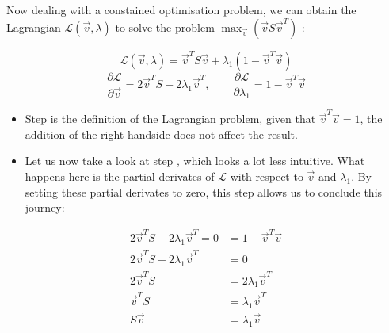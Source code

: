 Now dealing with a constained optimisation problem, we can obtain the Lagrangian $\mathcal{L}(\overrightarrow{v}, \lambda)$ to solve the problem $\max_{\overrightarrow{v}} (\overrightarrow{v} S \overrightarrow{v}^T)$ \cite{deisenroth2020mathematics}:

\begin{equation}
	\label{formula:maxOptimisationI}
	\mathcal{L}(\overrightarrow{v}, \lambda) = \overrightarrow{v}^T S \overrightarrow{v} + \lambda_1 (1 - \overrightarrow{v}^T\overrightarrow{v})
\end{equation}
\begin{equation}
	\label{formula:maxOptimisationII}
	\frac{\partial \mathcal{L}}{\partial \overrightarrow{v}} = 2 \overrightarrow{v}^T S - 2 \lambda_1 \overrightarrow{v}^T,
	\quad \quad
	\frac{\partial \mathcal{L}}{\partial \lambda_1} = 1 - \overrightarrow{v}^T \overrightarrow{v}
\end{equation}

\vspace{2mm}

\begin{itemize}
	\item Step  is the definition of the Lagrangian problem, given that $\overrightarrow{v}^T\overrightarrow{v}=1$, the addition of the right handside does not affect the result.
	\item Let us now take a look at step , which looks a lot less intuitive. 
	What happens here is the partial derivates of $\mathcal{L}$ with respect to $\overrightarrow{v}$ and $\lambda_1$.
	By setting these partial derivates to zero, this step allows us to conclude this journey:
\end{itemize}

\vspace{-16mm}
{
\begin{align}
	\label{formula:maxOptimisationIII}
	2 \overrightarrow{v}^T S - 2 \lambda_1 \overrightarrow{v}^T = 0 &= 1 - \overrightarrow{v}^T \overrightarrow{v}
	\\
	\label{formula:maxOptimisationIV}
	2 \overrightarrow{v}^T S - 2 \lambda_1 \overrightarrow{v}^T &= 0
	\\
	\label{formula:maxOptimisationV}
	2 \overrightarrow{v}^T S &= 2 \lambda_1 \overrightarrow{v}^T
	\\
	\label{formula:maxOptimisationVI}
	\overrightarrow{v}^T S &= \lambda_1 \overrightarrow{v}^T
	\\
	\label{formula:maxOptimisationVII}
	S \overrightarrow{v} &= \lambda_1 \overrightarrow{v}
\end{align}
}


